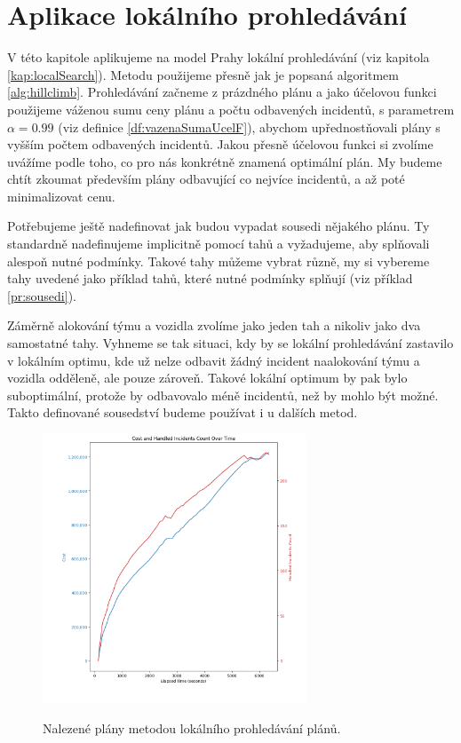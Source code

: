 \section{Aplikace lokálního prohledávání}

V této kapitole aplikujeme na model Prahy lokální prohledávání (viz kapitola \ref{kap:localSearch}).
Metodu použijeme přesně jak je popsaná algoritmem \ref{alg:hillclimb}.
Prohledávání začneme z prázdného plánu a jako účelovou funkci použijeme váženou sumu ceny plánu a počtu odbavených incidentů, s parametrem $\alpha = 0.99$ (viz definice \ref{df:vazenaSumaUcelF}),
abychom upřednostňovali plány s vyšším počtem odbavených incidentů.
Jakou přesně účelovou funkci si zvolíme uvážíme podle toho, co pro nás konkrétně znamená optimální plán.
My budeme chtít zkoumat především plány odbavující co nejvíce incidentů, a až poté minimalizovat cenu.

Potřebujeme ještě nadefinovat jak budou vypadat sousedi nějakého plánu.
Ty standardně nadefinujeme implicitně pomocí tahů a vyžadujeme, aby splňovali alespoň nutné podmínky.
Takové tahy můžeme vybrat různě, my si vybereme tahy uvedené jako příklad tahů, které nutné podmínky splňují (viz příklad \ref{pr:sousedi}).

Záměrně alokování týmu a vozidla zvolíme jako jeden tah a nikoliv jako dva samostatné tahy. Vyhneme se tak situaci, kdy by se lokální prohledávání zastavilo v lokálním optimu, 
kde už nelze odbavit žádný incident naalokování týmu a vozidla odděleně, ale pouze zároveň.
Takové lokální optimum by pak bylo suboptimální, protože by odbavovalo méně incidentů, než by mohlo být možné.
Takto definované sousedství budeme používat i u dalších metod.

\begin{figure}[H]
  \caption{Nalezené plány metodou lokálního prohledávání plánů.}
  \includegraphics[width=0.7\textwidth,height=0.7\textwidth]{img/plots/localSearch_empty.png}
  \centering
  \label{img:localSearchRes}
\end{figure}

